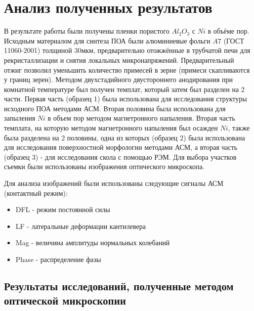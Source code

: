 \section{Анализ полученных результатов}

В результате работы были получены пленки пористого $Al_2O_3$ с $Ni$ в объёме пор. Исходным материалом для синтеза ПОА были алюминиевые фольги $A7$ (ГОСТ 11060-2001) толщиной $30\text{мкм}$, предварительно отожжённые в трубчатой печи для рекристаллизации и снятия локальных микронапряжений. Предварительный отжиг позволил уменьшить количество примесей в зерне (примеси скапливаются у границ зерен). Методом двухстадийного двустороннего анодирования при комнатной температуре был получен темплат, который затем был разделен на 2 части. Первая часть (образец 1) была использована для исследования структуры исходного ПОА методами АСМ. Вторая половина была использована для запыления $Ni$ в объем пор методом магнетронного напыления. Вторая часть темплата, на которую методом магнетронного напыления был осажден $Ni$, также была разделена на 2 половины, одна из которых (образец 2) была использована для исследования поверхностной морфологии методами АСМ, а вторая часть (образец 3) - для исследования скола с помощью РЭМ. Для выбора участков съемки были использованы изображения оптического микроскопа.

Для анализа изображений были использованы следующие сигналы АСМ (контактный режим):

\begin{itemize}
    \item DFL - режим постоянной силы
    \item LF - латеральные деформации кантилевера
    \item Mag - величина амплитуды нормальных колебаний
    \item Phase - распределение фазы
\end{itemize}

\subsection{Результаты исследований, полученные методом оптической микроскопии}




